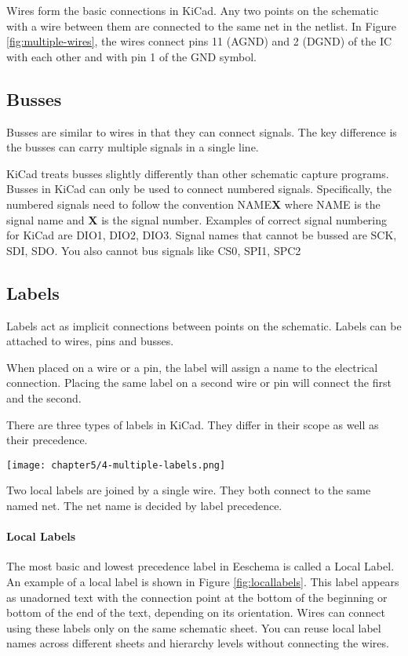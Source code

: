 Wires form the basic connections in KiCad.
Any two points on the schematic with a wire between them are connected to the same net in the netlist.
In Figure \ref{fig:multiple-wires}, the wires connect pins 11 (AGND) and 2 (DGND) of the IC with each other and with pin 1 of the GND symbol.

\subsection{Busses}

Busses are similar to wires in that they can connect signals.
The key difference is the busses can carry multiple signals in a single line.

KiCad treats busses slightly differently than other schematic capture programs.
Busses in KiCad can only be used to connect numbered signals.
Specifically, the numbered signals need to follow the convention \textsc{NAME}\textbf{X} where \textsc{NAME} is the signal name and \textbf{X} is the signal number.
Examples of correct signal numbering for KiCad are \textsc{DIO1}, \textsc{DIO2}, \textsc{DIO3}.
Signal names that cannot be bussed are \textsc{SCK}, \textsc{SDI}, \textsc{SDO}.
You also cannot bus signals like \textsc{CS0}, \textsc{SPI1}, \textsc{SPC2}

\subsection{Labels}

Labels act as implicit connections between points on the schematic.  
Labels can be attached to wires, pins and busses.

When placed on a wire or a pin, the label will assign a name to the electrical connection.
Placing the same label on a second wire or pin will connect the first and the second.

There are three types of labels in KiCad.
They differ in their scope as well as their precedence.

\begin{marginfigure}
	\texttt{[image: chapter5/4-multiple-labels.png]}
	\caption[Local Labels]{
		Two local labels are joined by a single wire.  
		They both connect to the same named net.
		The net name is decided by label precedence.
	}
	\label{fig:locallabels}
\end{marginfigure}
\paragraph{Local Labels} 
The most basic and lowest precedence label in Eeschema is called a Local Label.
An example of a local label is shown in Figure \ref{fig:locallabels}.
This label appears as unadorned text with the connection point at the bottom of the beginning or bottom of the end of the text, depending on its orientation.
Wires can connect using these labels only on the same schematic sheet.
You can reuse local label names across different sheets and hierarchy levels without connecting the wires.

